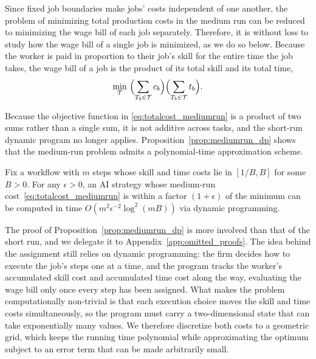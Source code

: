 Since fixed job boundaries make jobs' costs independent of one another, the problem of minimizing total production costs in the medium run can be reduced to minimizing the wage bill of each job separately. 
Therefore, it is without loss to study how the wage bill of a single job is minimized, as we do so below.
Because the worker is paid in proportion to their job's skill for the entire time the job takes, the wage bill of a job is the product of its total skill and its total time,
\begin{align}
\label{eq:totalcost_mediumrun}
\min_{\mathcal{T}} \ \Bigl(\sum_{T_b \in \mathcal{T}} c_{b}\Bigr)\Bigl(\sum_{T_b \in \mathcal{T}} t_{b}\Bigr).
\end{align}

Because the objective function in \eqref{eq:totalcost_mediumrun} is a product of two sums rather than a single sum, it is not additive across tasks, and the short-run dynamic program no longer applies.
Proposition~\ref{prop:mediumrun_dp} shows that the medium-run problem admits a polynomial-time approximation scheme.

\begin{proposition}
\label{prop:mediumrun_dp}
Fix a workflow with $m$ steps whose skill and time costs lie in $[1/B, B]$ for some $B > 0$.
For any $\epsilon > 0$, an AI strategy whose medium-run cost~\eqref{eq:totalcost_mediumrun} is within a factor $(1+\epsilon)$ of the minimum can be computed in time $O(m^2 \epsilon^{-2} \log^2(mB))$ via dynamic programming.
\end{proposition}

The proof of Proposition~\ref{prop:mediumrun_dp} is more involved than that of the short run, and we delegate it to Appendix~\ref{app:omitted_proofs}.
The idea behind the assignment still relies on dynamic programming: the firm decides how to execute the job's steps one at a time, and the program tracks the worker's accumulated skill cost and accumulated time cost along the way, evaluating the wage bill only once every step has been assigned.
What makes the problem computationally non-trivial is that each execution choice moves the skill and time costs simultaneously, so the program must carry a two-dimensional state that can take exponentially many values.
We therefore discretize both costs to a geometric grid, which keeps the running time polynomial while approximating the optimum subject to an error term that can be made arbitrarily small.


